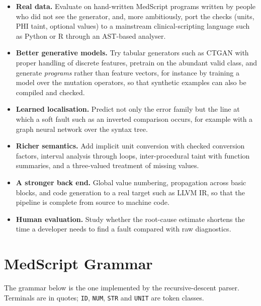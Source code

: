 \documentclass[conference]{IEEEtran}
\newcommand{\code}[1]{\texttt{#1}}
\begin{document}
\begin{itemize}
    \item \textbf{Real data.} Evaluate on hand-written MedScript programs written by people who did not see the generator, and, more ambitiously, port the
    checks (units, PHI taint, optional values) to a mainstream clinical-scripting language such as Python or R through an AST-based analyser.
    \item \textbf{Better generative models.} Try tabular generators such as CTGAN with proper handling of discrete features, pretrain on the abundant
    valid class, and generate \emph{programs} rather than feature vectors, for instance by training a model over the mutation operators, so that synthetic examples can also be compiled and checked.
    \item \textbf{Learned localisation.} Predict not only the error family but the line at which a soft fault such as an inverted comparison occurs, for example with a
    graph neural network over the syntax tree.
    \item \textbf{Richer semantics.} Add implicit unit conversion with checked conversion factors, interval analysis through loops, inter-procedural taint with function
    summaries, and a three-valued treatment of missing values.
    \item \textbf{A stronger back end.} Global value numbering, propagation across basic blocks, and code generation to a real target such as LLVM IR, so that the pipeline is
    complete from source to machine code.
    \item \textbf{Human evaluation.} Study whether the root-cause estimate shortens the time a developer needs to find a fault compared with raw diagnostics.
\end{itemize}


\appendices
\section{MedScript Grammar}\label{app:grammar}

The grammar below is the one implemented by the recursive-descent parser. Terminals are in quotes; \code{ID},
\code{NUM}, \code{STR} and \code{UNIT} are token classes.
\end{document}
